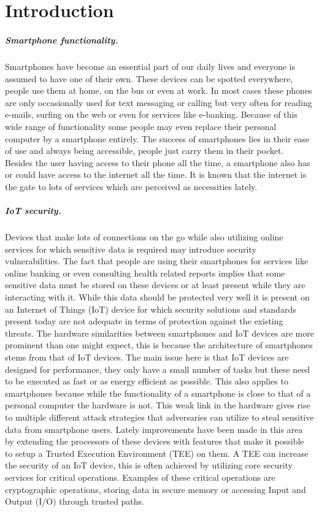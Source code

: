 \chapter{Introduction}

\paragraph*{Smartphone functionality.} 
Smartphones have become an essential part of our daily lives and everyone is assumed to have one of their own. These devices can be spotted everywhere, people use them at home, on the bus or even at work. In most cases these phones are only occasionally used for text messaging or calling but very often for reading e-mails, surfing on the web or even for services like e-banking. Because of this wide range of functionality some people may even replace their personal computer by a smartphone entirely. The success of smartphones lies in their ease of use and always being accessible, people just carry them in their pocket. Besides the user having access to their phone all the time, a smartphone also has or could have access to the internet all the time. It is known that the internet is the gate to lots of services which are perceived as necessities lately.

\paragraph*{IoT security.}
Devices that make lots of connections on the go while also utilizing online services for which sensitive data is required may introduce security vulnerabilities. The fact that people are using their smartphones for services like online banking or even consulting health related reports implies that some sensitive data must be stored on these devices or at least present while they are interacting with it. While this data should be protected very well it is present on an Internet of Things (IoT) device for which security solutions and standards present today are not adequate in terms of protection against the existing threats. The hardware similarities between smartphones and IoT devices are more prominent than one might expect, this is because the architecture of smartphones stems from that of IoT devices. The main issue here is that IoT devices are designed for performance, they only have a small number of tasks but these need to be executed as fast or as energy efficient as possible. This also applies to smartphones because while the functionality of a smartphone is close to that of a personal computer the hardware is not. This weak link in the hardware gives rise to multiple different attack strategies that adversaries can utilize to steal sensitive data from smartphone users. Lately improvements have been made in this area by extending the processors of these devices with features that make it possible to setup a Trusted Execution Environment (TEE) on them. A TEE can increase the security of an IoT device, this is often achieved by utilizing core security services for critical operations. Examples of these critical operations are cryptographic operations, storing data in secure memory or accessing Input and Output (I/O) through trusted paths.

